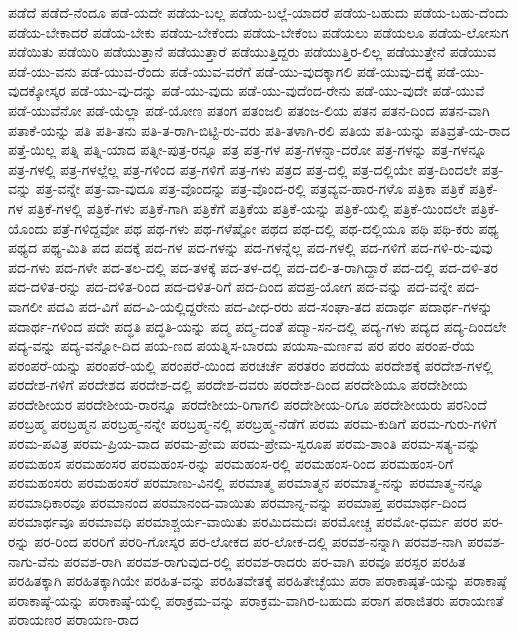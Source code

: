 {ಪಡೆದೆ
ಪಡೆದೆ-ನೆಂದೂ
ಪಡೆ-ಯದೇ
ಪಡೆಯ-ಬಲ್ಲ
ಪಡೆಯ-ಬಲ್ಲೆ-ಯಾದರೆ
ಪಡೆಯ-ಬಹುದು
ಪಡೆಯ-ಬಹು-ದೆಂದು
ಪಡೆಯ-ಬೇಕಾದರೆ
ಪಡೆಯ-ಬೇಕು
ಪಡೆಯ-ಬೇಕೆಂದು
ಪಡೆಯ-ಬೇಕೆಂಬ
ಪಡೆಯಲು
ಪಡೆಯಲೂ
ಪಡೆಯ-ಲೋಸುಗ
ಪಡೆಯಿತು
ಪಡೆಯಿರಿ
ಪಡೆಯುತ್ತಾನೆ
ಪಡೆಯುತ್ತಾರೆ
ಪಡೆಯುತ್ತಿದ್ದರು
ಪಡೆಯುತ್ತಿರ-ಲಿಲ್ಲ
ಪಡೆಯುತ್ತೇನೆ
ಪಡೆಯುವ
ಪಡೆ-ಯು-ವನು
ಪಡೆ-ಯುವ-ರೆಂದು
ಪಡೆ-ಯುವ-ವರೆಗೆ
ಪಡೆ-ಯು-ವುದಕ್ಕಾಗಲಿ
ಪಡೆ-ಯುವು-ದಕ್ಕೆ
ಪಡೆ-ಯು-ವುದಕ್ಕೋಸ್ಕರ
ಪಡೆ-ಯು-ವು-ದನ್ನು
ಪಡೆ-ಯು-ವುದು
ಪಡೆ-ಯು-ವುದೆಂದ-ರೇನು
ಪಡೆ-ಯು-ವುದೇ
ಪಡೆ-ಯುವೆ
ಪಡೆ-ಯುವೆನೋ
ಪಡೆ-ಯೆಲ್ಲಾ
ಪಡೆ-ಯೋಣ
ಪತಂಗ
ಪತಂಜಲಿ
ಪತಂಜ-ಲಿಯ
ಪತನ
ಪತನ-ದಿಂದ
ಪತನ-ವಾಗಿ
ಪತಾಕೆ-ಯನ್ನು
ಪತಿ
ಪತಿ-ತನು
ಪತಿ-ತ-ರಾಗಿ-ಬಿಟ್ಟಿ-ರು-ವರು
ಪತಿ-ತಳಾಗಿ-ರಲಿ
ಪತಿಯ
ಪತಿ-ಯನ್ನು
ಪತಿವ್ರತೆ-ಯ-ರಾದ
ಪತ್ತೆ-ಯಿಲ್ಲ
ಪತ್ನಿ
ಪತ್ನಿ-ಯಾದ
ಪತ್ನೀ-ಪುತ್ರ-ರನ್ನೂ
ಪತ್ರ
ಪತ್ರ-ಗಳ
ಪತ್ರ-ಗಳನ್ನಾ-ದರೋ
ಪತ್ರ-ಗಳನ್ನು
ಪತ್ರ-ಗಳನ್ನೂ
ಪತ್ರ-ಗಳಲ್ಲಿ
ಪತ್ರ-ಗಳಲ್ಲೆಲ್ಲ
ಪತ್ರ-ಗಳಿಂದ
ಪತ್ರ-ಗಳಿಗೆ
ಪತ್ರ-ಗಳು
ಪತ್ರದ
ಪತ್ರ-ದಲ್ಲಿ
ಪತ್ರ-ದಲ್ಲಿಯೇ
ಪತ್ರ-ದಿಂದಲೇ
ಪತ್ರ-ವನ್ನು
ಪತ್ರ-ವನ್ನೇ
ಪತ್ರ-ವಾ-ವುದೂ
ಪತ್ರ-ವೊಂದನ್ನು
ಪತ್ರ-ವೊಂದ-ರಲ್ಲಿ
ಪತ್ರವ್ಯವ-ಹಾರ-ಗಳೊ
ಪತ್ರಿಕಾ
ಪತ್ರಿಕೆ
ಪತ್ರಿಕೆ-ಗಳ
ಪತ್ರಿಕೆ-ಗಳಲ್ಲಿ
ಪತ್ರಿಕೆ-ಗಳು
ಪತ್ರಿಕೆ-ಗಾಗಿ
ಪತ್ರಿಕೆಗೆ
ಪತ್ರಿಕೆಯ
ಪತ್ರಿಕೆ-ಯನ್ನು
ಪತ್ರಿಕೆ-ಯಲ್ಲಿ
ಪತ್ರಿಕೆ-ಯಿಂದಲೇ
ಪತ್ರಿಕೆ-ಯೊಂದು
ಪತ್ರೆ-ಗಳಿದ್ದವೋ
ಪಥ
ಪಥ-ಗಳು
ಪಥ-ಗಳೆಷ್ಟೋ
ಪಥದ
ಪಥ-ದಲ್ಲಿ
ಪಥ-ದಲ್ಲಿಯೂ
ಪಥಿ
ಪಥಿ-ಕರು
ಪಥ್ಯ
ಪಥ್ಯದ
ಪಥ್ಯ-ಮಿತಿ
ಪದ
ಪದಕ್ಕೆ
ಪದ-ಗಳ
ಪದ-ಗಳನ್ನು
ಪದ-ಗಳನ್ನೆಲ್ಲ
ಪದ-ಗಳಲ್ಲಿ
ಪದ-ಗಳಿಗೆ
ಪದ-ಗಳಿ-ರು-ವುವು
ಪದ-ಗಳು
ಪದ-ಗಳೇ
ಪದ-ತಲ-ದಲ್ಲಿ
ಪದ-ತಳಕ್ಕೆ
ಪದ-ತಳ-ದಲ್ಲಿ
ಪದ-ದಲಿ-ತ-ರಾಗಿದ್ದಾರೆ
ಪದ-ದಲ್ಲಿ
ಪದ-ದಳಿ-ತರ
ಪದ-ದಳಿತ-ರನ್ನು
ಪದ-ದಳಿತ-ರಿಂದ
ಪದ-ದಳಿತ-ರಿಗೆ
ಪದ-ದಿಂದ
ಪದಪ್ರ-ಯೋಗ
ಪದ-ವನ್ನು
ಪದ-ವನ್ನೇ
ಪದ-ವಾಗಲೀ
ಪದವಿ
ಪದ-ವಿಗೆ
ಪದ-ವಿ-ಯಲ್ಲಿದ್ದರೇನು
ಪದ-ವೀಧ-ರರು
ಪದ-ಸಂಘಾ-ತದ
ಪದಾರ್ಥ
ಪದಾರ್ಥ-ಗಳನ್ನು
ಪದಾರ್ಥ-ಗಳಿಂದ
ಪದೇ
ಪದ್ಧತಿ
ಪದ್ಧತಿ-ಯನ್ನು
ಪದ್ಮ
ಪದ್ಮ-ದಂತೆ
ಪದ್ಮಾ-ಸನ-ದಲ್ಲಿ
ಪದ್ಯ-ಗಳು
ಪದ್ಯದ
ಪದ್ಯ-ದಿಂದಲೇ
ಪದ್ಯ-ವನ್ನು
ಪದ್ಯ-ವನ್ನೋ-ದಿದ
ಪಯ-ಣದ
ಪಯತ್ನಿಸ-ಬಾರದು
ಪಯಸಾ-ಮರ್ಣವ
ಪರ
ಪರಂ
ಪರಂಪ-ರೆಯ
ಪರಂಪರೆ-ಯನ್ನು
ಪರಂಪರೆ-ಯಲ್ಲಿ
ಪರಂಪರೆ-ಯಿಂದ
ಪರಚರ್ಚೆ
ಪರತರಂ
ಪರದೆಯ
ಪರದೇಶಕ್ಕೆ
ಪರದೇಶ-ಗಳಲ್ಲಿ
ಪರದೇಶ-ಗಳಿಗೆ
ಪರದೇಶದ
ಪರದೇಶ-ದಲ್ಲಿ
ಪರದೇಶ-ದವರು
ಪರದೇಶ-ದಿಂದ
ಪರದೇಶಿಯೂ
ಪರದೇಶೀಯ
ಪರದೇಶೀಯರ
ಪರದೇಶೀಯ-ರಾರನ್ನೂ
ಪರದೇಶೀಯ-ರಿಗಾಗಲಿ
ಪರದೇಶೀಯ-ರಿಗೂ
ಪರದೇಶೀಯರು
ಪರನಿಂದೆ
ಪರಬ್ರಹ್ಮ
ಪರಬ್ರಹ್ಮನ
ಪರಬ್ರಹ್ಮ-ನನ್ನೇ
ಪರಬ್ರಹ್ಮ-ನಲ್ಲಿ
ಪರಬ್ರಹ್ಮ-ನೆಡೆಗೆ
ಪರಮ
ಪರಮ-ಕುಡಿಗೆ
ಪರಮ-ಗುರು-ಗಳಿಗೆ
ಪರಮ-ಪವಿತ್ರ
ಪರಮ-ಪ್ರಿಯ-ವಾದ
ಪರಮ-ಪ್ರೇಮ
ಪರಮ-ಪ್ರೇಮ-ಸ್ವರೂಪ
ಪರಮ-ಶಾಂತಿ
ಪರಮ-ಸತ್ಯ-ವನ್ನು
ಪರಮಹಂಸ
ಪರಮಹಂಸರ
ಪರಮಹಂಸ-ರನ್ನು
ಪರಮಹಂಸ-ರಲ್ಲಿ
ಪರಮಹಂಸ-ರಿಂದ
ಪರಮಹಂಸ-ರಿಗೆ
ಪರಮಹಂಸರು
ಪರಮಹಂಸರೆ
ಪರಮಾಣು-ವಿನಲ್ಲಿ
ಪರಮಾತ್ಮ
ಪರಮಾತ್ಮನ
ಪರಮಾತ್ಮ-ನನ್ನು
ಪರಮಾತ್ಮ-ನನ್ನೂ
ಪರಮಾಧಿಕಾರವೂ
ಪರಮಾನಂದ
ಪರಮಾನಂದ-ವಾಯಿತು
ಪರಮಾನ್ನ-ವನ್ನು
ಪರಮಾಪ್ತ
ಪರಮಾರ್ಥ-ದಿಂದ
ಪರಮಾರ್ಥವೂ
ಪರಮಾವಧಿ
ಪರಮಾಶ್ಚರ್ಯ-ವಾಯಿತು
ಪರಮಿದಮದಃ
ಪರಮೋಚ್ಚ
ಪರಮೋ-ಧರ್ಮ
ಪರರ
ಪರ-ರನ್ನು
ಪರ-ರಿಂದ
ಪರರಿಗೆ
ಪರರಿ-ಗೋಸ್ಕರ
ಪರ-ಲೋಕದ
ಪರ-ಲೋಕ-ದಲ್ಲಿ
ಪರವಶ-ನನ್ನಾಗಿ
ಪರವಶ-ನಾಗಿ
ಪರವಶ-ನಾಗು-ವೆನು
ಪರವಶ-ರಾಗಿ
ಪರವಶ-ರಾಗುವುದ-ರಲ್ಲಿ
ಪರವಶ-ರಾದರು
ಪರ-ವಾಗಿ
ಪರವೂ
ಪರಸ್ಪರ
ಪರಹಿತ
ಪರಹಿತಕ್ಕಾಗಿ
ಪರಹಿತಕ್ಕಾಗಿಯೇ
ಪರಹಿತ-ವನ್ನು
ಪರಹಿತವೇತಕ್ಕೆ
ಪರಹಿತೇಚ್ಛೆಯು
ಪರಾ
ಪರಾಕಾಷ್ಠತೆ-ಯನ್ನು
ಪರಾಕಾಷ್ಠೆ
ಪರಾಕಾಷ್ಠೆ-ಯನ್ನು
ಪರಾಕಾಷ್ಠೆ-ಯಲ್ಲಿ
ಪರಾಕ್ರಮ-ವನ್ನು
ಪರಾಕ್ರಮ-ವಾಗಿರ-ಬಹುದು
ಪರಾಗ
ಪರಾಜಿತರು
ಪರಾಯಣತೆ
ಪರಾಯಣರ
ಪರಾಯಣ-ರಾದ
}
